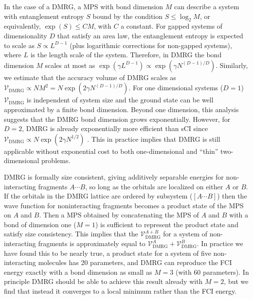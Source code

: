 \documentclass[aip,jcp,amsmath,amssymb, reprint]{revtex4-1}
\begin{document}
In the case of a DMRG, a MPS with bond dimension $M$ can describe a system with entanglement entropy $S$ bound by the condition $S \leq \log_2 M$,\cite{Evenbly2011TensorNetwork} or equivalently, $\exp(S) \leq C M$, with $C$ a constant.
For gapped systems of dimensionality $D$ that satisfy an area law, the entanglement entropy is expected to scale as $S \propto L^{D-1}$ (plus  logarithmic corrections for non-gapped systems), where $L$ is the length scale of the system.\cite{hastings2004lieb}
Therefore, in DMRG the bond dimension $M$ scales at most as $\exp(\gamma L^{D-1}) \propto \exp(\gamma N^{(D-1)/D})$.
Similarly, we estimate that the accuracy volume of DMRG scales as $\mathcal{V}_{\text{DMRG}} \propto N M^2 =  N \exp(2 \gamma N^{(D-1)/D})$.
For one dimensional systems ($D = 1$) $\mathcal{V}_{\text{DMRG}}$ is independent of system size and the ground state can be well approximated by a finite bond dimension.
Beyond one dimension, this analysis suggests that the DMRG bond dimension grows exponentially.
However, for $D = 2$, DMRG is already exponentially more efficient than sCI since  $\mathcal{V}_{\text{DMRG}}\propto N \exp(2 \gamma N^{1/2})$ .
This in practice implies that DMRG is still applicable without exponential cost to both one-dimensional and ``thin'' two-dimensional problems.\cite{stoudenmire2012studying}

DMRG is formally size consistent, giving additively separable energies for non-interacting fragments $A\cdots B$, so long as the orbitals are localized on either $A$ or $B$.\cite{chan2011density, Wouters2014TheDensity} 
If the orbitals in the DMRG lattice are ordered by subsystem ($[A\cdots B]$) then the wave function for noninteracting fragments becomes a product state of the MPS on $A$ and $B$.
Then a MPS obtained by concatenating the MPS of $A$ and $B$ with a bond of dimension one ($M=1$) is sufficient to represent the product state and satisfy size consistency.
This implies that the $\mathcal{V}^{A+B}_{\text{DMRG}}$ for a system of non-interacting fragments is approximately equal to $\mathcal{V}^{A}_{\text{DMRG}} + \mathcal{V}^{B}_{\text{DMRG}}$. In practice we have found this to be nearly true, a product state for a system of five non-interacting  molecules has 20 parameters, and DMRG can reproduce the FCI energy exactly with a bond dimension as small as $M=3$ (with 60 parameters). 
In principle DMRG should be able to achieve this result already with $M=2$, but we find that instead it converges to a local minimum rather than the FCI energy.
\end{document}
